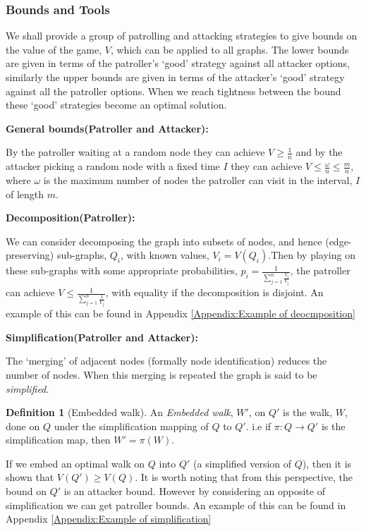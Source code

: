 \documentclass[a4paper,10pt]{article}
\theoremstyle{definition}
\newtheorem{definition}[theorem]{Definition}
\theoremstyle{definition}
\theoremstyle{remark}
\theoremstyle{definition}
\begin{document}
\subsubsection{Bounds and Tools}
We shall provide a group of patrolling and attacking strategies to give bounds on the value of the game, $V$, which can be applied to all graphs. The lower bounds are given in terms of the patroller's `good' strategy against all attacker options, similarly the upper bounds are given in terms of the attacker's `good' strategy against all the patroller options. When we reach tightness between the bound these `good' strategies become an optimal solution.

\textbf{General bounds(Patroller and Attacker):}

By the patroller waiting at a random node they can achieve $V \geq \frac{1}{n}$ and by the attacker picking a random node with a fixed time $I$ they can achieve $V \leq \frac{\omega}{n} \leq \frac{m}{n}$, where $\omega$ is the maximum number of nodes the patroller can visit in the interval, $I$ of length $m$.

\textbf{Decomposition(Patroller):}

We can consider decomposing the graph into subsets of nodes, and hence (edge-preserving) sub-graphs, $Q_{i}$, with known values, $V_{i}=V(Q_{i})$.Then by playing on these sub-graphs with some appropriate probabilities, $p_{i}= \frac{1}{\sum\limits_{j=1}^{n} \frac{V_{i} }{V_{j}}}$, the patroller can achieve $V \leq \frac{1}{\sum\limits_{j=1}^{n} \frac{1}{V_{j}}}$, with equality if the decomposition is disjoint. An example of this can be found in Appendix \ref{Appendix:Example of deocmposition}

\textbf{Simplification(Patroller and Attacker):}

The `merging' of adjacent nodes (formally node identification) reduces the number of nodes. When this merging is repeated the graph is said to be \textit{simplified}.

\begin{definition}[Embedded walk]
An \textit{Embedded walk}, $W'$, on $Q'$ is the walk, $W$, done on $Q$ under the simplification mapping of $Q$ to $Q'$. i.e if $\pi :Q \rightarrow Q'$ is the simplification map, then $W'=\pi (W)$.
\end{definition}

If we embed an optimal walk on $Q$ into $Q'$ (a simplified version of $Q$), then it is shown that $V(Q') \geq V(Q)$. It is worth noting that from this perspective, the bound on $Q'$ is an attacker bound. However by considering an opposite of simplification we can get patroller bounds. An example of this can be found in Appendix \ref{Appendix:Example of simplification}
\end{document}
